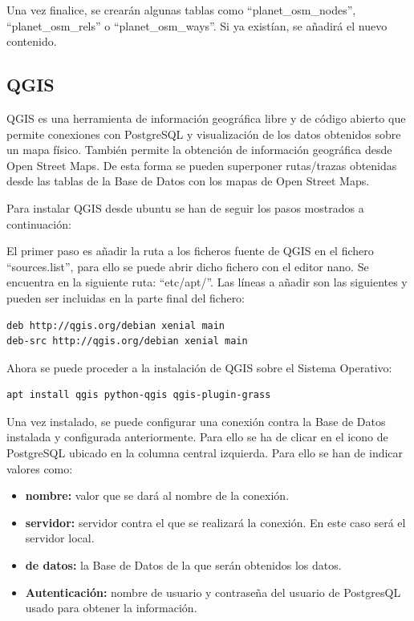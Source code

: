 Una vez finalice, se crearán algunas tablas como ``planet\_osm\_nodes'', ``planet\_osm\_rels'' o ``planet\_osm\_ways''. Si ya existían, se añadirá el nuevo contenido.


\subsection{QGIS}
QGIS es una herramienta de información geográfica libre y de código abierto que permite conexiones con PostgreSQL y visualización de los datos obtenidos sobre un mapa físico. También permite la obtención de información geográfica desde Open Street Maps. De esta forma se pueden superponer rutas/trazas obtenidas desde las tablas de la Base de Datos con los mapas de Open Street Maps.

Para instalar QGIS desde ubuntu se han de seguir los pasos mostrados a continuación:

El primer paso es añadir la ruta a los ficheros fuente de QGIS en el fichero ``sources.list'', para ello se puede abrir dicho fichero con el editor nano. Se encuentra en la siguiente ruta: ``etc/apt/''.
Las líneas a añadir son las siguientes y pueden ser incluidas en la parte final del fichero:
\begin{lstlisting}
deb http://qgis.org/debian xenial main
deb-src http://qgis.org/debian xenial main
\end{lstlisting}

Ahora se puede proceder a la instalación de QGIS sobre el Sistema Operativo:

\begin{lstlisting}
apt install qgis python-qgis qgis-plugin-grass
\end{lstlisting}

Una vez instalado, se puede configurar una conexión contra la Base de Datos instalada y configurada anteriormente. Para ello se ha de clicar en el icono de PostgreSQL ubicado en la columna central izquierda. Para ello se han de indicar valores como:

\begin{itemize}
\item \textbf{nombre:} valor que se dará al nombre de la conexión.
\item \textbf{servidor:} servidor contra el que se realizará la conexión. En este caso será el servidor local.
\item \textbf{ de datos:} la Base de Datos de la que serán obtenidos los datos.
\item \textbf{Autenticación:} nombre de usuario y contraseña  del usuario de PostgresQL usado para obtener la información.
\end{itemize}

